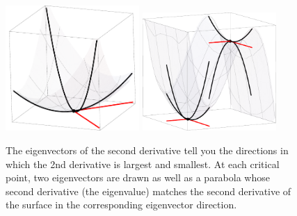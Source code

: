 \begin{figure}[ht
]\begin{center}
\includegraphics[width=2in]{support/2nddertest1}
\hspace{.5in}
\includegraphics[width=2in]{support/2nddertest2}
\end{center}
\caption{The eigenvectors of the second derivative tell you the directions in which the 2nd derivative is largest and smallest. At each critical point, two eigenvectors are drawn as well as a parabola whose second derivative (the eigenvalue) matches the second derivative of the surface in the corresponding eigenvector direction.}
\label{2ndder}
\end{figure}
















